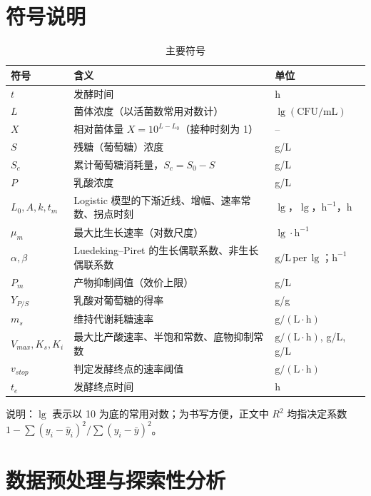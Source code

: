 \documentclass[12pt,a4paper]{ctexart}
\begin{document}
\section{符号说明}

\begin{table}[H]
\centering
\caption{主要符号}
\small
\begin{tabular}{l p{9.2cm} p{3.6cm}}
\toprule
符号 & 含义 & 单位 \\
\midrule
$t$ & 发酵时间 & h \\
$L$ & 菌体浓度（以活菌数常用对数计） & $\lg(\mathrm{CFU/mL})$ \\
$X$ & 相对菌体量 $X=10^{L-L_0}$（接种时刻为 1） & -- \\
$S$ & 残糖（葡萄糖）浓度 & g/L \\
$S_c$ & 累计葡萄糖消耗量，$S_c=S_0-S$ & g/L \\
$P$ & 乳酸浓度 & g/L \\
$L_0,A,k,t_m$ & Logistic 模型的下渐近线、增幅、速率常数、拐点时刻 & $\lg$，$\lg$，$\mathrm{h^{-1}}$，h \\
$\mu_m$ & 最大比生长速率（对数尺度） & $\lg\cdot\mathrm{h^{-1}}$ \\
$\alpha,\beta$ & Luedeking--Piret 的生长偶联系数、非生长偶联系数 & $\mathrm{g/L}$\,per\,$\lg$；$\mathrm{h^{-1}}$ \\
$P_m$ & 产物抑制阈值（效价上限） & g/L \\
$Y_{P/S}$ & 乳酸对葡萄糖的得率 & g/g \\
$m_s$ & 维持代谢耗糖速率 & $\mathrm{g/(L\cdot h)}$ \\
$V_{max},K_s,K_i$ & 最大比产酸速率、半饱和常数、底物抑制常数 & $\mathrm{g/(L\cdot h)}$, g/L, g/L \\
$v_{stop}$ & 判定发酵终点的速率阈值 & $\mathrm{g/(L\cdot h)}$ \\
$t_e$ & 发酵终点时间 & h \\
\bottomrule
\end{tabular}
\end{table}

\noindent 说明：$\lg$ 表示以 10 为底的常用对数；为书写方便，正文中 $R^2$ 均指决定系数 $1-\sum(y_i-\hat y_i)^2/\sum(y_i-\bar y)^2$。

\section{数据预处理与探索性分析}
\end{document}
